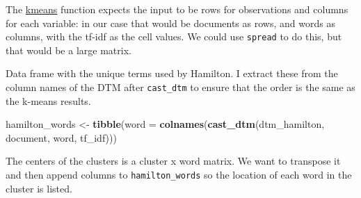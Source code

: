 \documentclass[]{book}
\newenvironment{Shaded}{\begin{snugshade}}{\end{snugshade}}
\newcommand{\CommentTok}[1]{\textcolor[rgb]{0.56,0.35,0.01}{\textit{#1}}}
\newcommand{\DataTypeTok}[1]{\textcolor[rgb]{0.13,0.29,0.53}{#1}}
\newcommand{\DecValTok}[1]{\textcolor[rgb]{0.00,0.00,0.81}{#1}}
\newcommand{\KeywordTok}[1]{\textcolor[rgb]{0.13,0.29,0.53}{\textbf{#1}}}
\newcommand{\NormalTok}[1]{#1}
\newcommand{\OperatorTok}[1]{\textcolor[rgb]{0.81,0.36,0.00}{\textbf{#1}}}
\newcommand{\StringTok}[1]{\textcolor[rgb]{0.31,0.60,0.02}{#1}}
\theoremstyle{definition}
\theoremstyle{definition}
\theoremstyle{definition}
\theoremstyle{remark}
\begin{document}
\begin{Shaded}
\end{Shaded}

The
\href{https://www.rdocumentation.org/packages/stats/topics/kmeans}{kmeans}
function expects the input to be rows for observations and columns for
each variable: in our case that would be documents as rows, and words as
columns, with the tf-idf as the cell values. We could use
\texttt{spread} to do this, but that would be a large matrix.

\begin{Shaded}
\end{Shaded}

Data frame with the unique terms used by Hamilton. I extract these from
the column names of the DTM after \texttt{cast\_dtm} to ensure that the
order is the same as the k-means results.

\begin{Shaded}
\begin{Highlighting}[]
\NormalTok{hamilton_words <-}
\StringTok{  }\KeywordTok{tibble}\NormalTok{(}\DataTypeTok{word =} \KeywordTok{colnames}\NormalTok{(}\KeywordTok{cast_dtm}\NormalTok{(dtm_hamilton, document, word, tf_idf)))}
\end{Highlighting}
\end{Shaded}

The centers of the clusters is a cluster x word matrix. We want to
transpose it and then append columns to \texttt{hamilton\_words} so the
location of each word in the cluster is listed.
\end{document}
